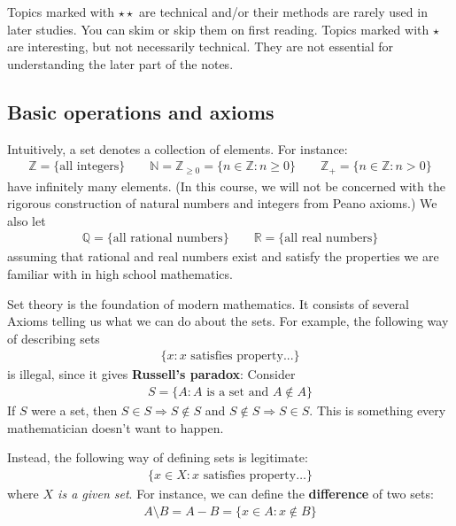 \documentclass[12pt,b5paper,notitlepage]{article}
\theoremstyle{definition}
\theoremstyle{plain}
\newcommand{\Nbb}{\mathbb N}
\newcommand{\Zbb}{\mathbb Z}
\newcommand{\Qbb}{\mathbb Q}
\newcommand{\Rbb}{\mathbb R}
\numberwithin{equation}{section}
\begin{document}
Topics marked with $\star\star$ are technical and/or their methods are rarely used in later studies. You can skim or skip them on first reading. Topics marked with $\star$ are interesting, but not necessarily technical. They are not essential for understanding the later part of the notes.




\subsection{Basic operations and axioms}
Intuitively, a set denotes a collection of elements. For instance:\index{N@$\Nbb=\{0,1,2,\dots\}$} \index{Z@$\Zbb_+=\{1,2,\dots\}$}
\begin{gather*}
\Zbb=\{\text{all integers}\}\qquad \Nbb=\Zbb_{\geq0}=\{n\in\Zbb:n\geq0\}\qquad \Zbb_+=\{n\in\Zbb:n>0\}
\end{gather*}
have infinitely many elements. (In this course, we will not be concerned with the rigorous construction of natural numbers and integers from Peano axioms.) We also let
\begin{align*}
\Qbb=\{\text{all rational numbers}\}\qquad\Rbb=\{\text{all real numbers}\}
\end{align*}
assuming that rational and real numbers exist and satisfy the properties we are familiar with in high school mathematics.


Set theory is the foundation of modern mathematics. It consists of several Axioms telling us what we can do about the sets. For example, the following way of describing sets
\begin{align}
\{x: x\text{ satisfies property...}\}  \label{eq1}
\end{align}
is illegal, since it gives \textbf{Russell's paradox}: Consider
\begin{align}
S=\{A: A\text{ is a set and }A\notin A\}\label{eq12}
\end{align}
If $S$ were a set, then $S\in S\Rightarrow S\notin S$ and $S\notin S\Rightarrow S\in S$. This is something every mathematician doesn't want to happen.

Instead, the following way of defining sets is legitimate:
\begin{align}
\{x\in X:x\text{ satisfies property}\dots\}  \label{eq2}
\end{align}
where \emph{$X$ is a given set}.  For instance, we can define the \textbf{difference} of two sets:
\begin{align*}
A\setminus B=A-B=\{x\in A:x\notin B\}
\end{align*}
\end{document}
